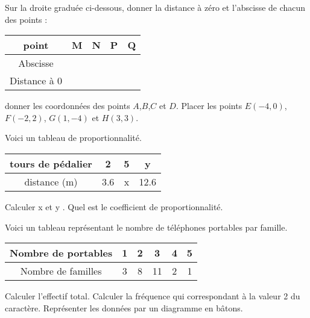 \documentclass[a4paper,addpoints,12pt]{exam}
\begin{document}
\devoir[sem=1,prv=false,ds=false,num=6 ,niv=1 ,date=28/05/2023,Rdate=30/05/2023]



\begin{exo}
Sur la droite graduée ci-dessous, donner la distance à zéro et l’abscisse de chacun des points   :


\begin{tabular}{|c|c|c|c|c|}
\hline 
point & M & N & P & Q \\ 
\hline 
Abscisse &  &  &  &  \\ 
\hline 
Distance à 0 &  &  &  &  \\ 
\hline 
\end{tabular} 
\begin{questions}
\question donner les coordonnées des points $A$,$B$,$C$ et $D$.
\question Placer les points $E(-4, 0)$, $F(-2, 2)$, $G(1, -4)$ et $H(3, 3)$.
\end{questions}
\begin{reper}
\end{reper}
\end{exo}

\begin{exo}
Voici un tableau de proportionnalité.
\begin{tabular}{|c|c|c|c|}
\hline 
tours de pédalier & 2 & 5 & y \\ 
\hline 
distance (m) & 3.6 & x & 12.6 \\ 
\hline 
\end{tabular} 
\begin{questions}
\question Calculer x et y .
\question Quel est le coefficient de proportionnalité.
\end{questions}
\end{exo}

\begin{exo}
Voici un tableau représentant le nombre de téléphones portables par famille.

\begin{tabular}{|c|c|c|c|c|c|}
\hline 
Nombre de portables & 1 & 2 & 3 & 4 & 5 \\ 
\hline 
Nombre de familles & 3 & 8 & 11 & 2 & 1 \\ 
\hline 
\end{tabular} 

\begin{questions}
\question Calculer l'effectif total.
\question Calculer la fréquence qui correspondant à la valeur 2 du caractère.
\question Représenter les données par un diagramme en bâtons.
\end{questions}
\end{exo}
\end{document}

